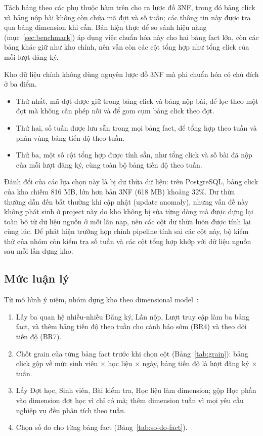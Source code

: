 Tách bảng theo các phụ thuộc hàm trên cho ra lược đồ 3NF, trong đó bảng click và bảng nộp bài không còn chứa mã đợt và số tuần; các thông tin này được tra qua bảng dimension khi cần. Bản hiện thực để so sánh hiệu năng (mục~\ref{sec:benchmark}) áp dụng việc chuẩn hóa này cho hai bảng fact lớn, còn các bảng khác giữ như kho chính, nên vẫn còn các cột tổng hợp như tổng click của mỗi lượt đăng ký.

Kho dữ liệu chính không dùng nguyên lược đồ 3NF mà phi chuẩn hóa có chủ đích ở ba điểm.
\begin{itemize}
    \item Thứ nhất, mã đợt được giữ trong bảng click và bảng nộp bài, để lọc theo một đợt mà không cần phép nối và để gom cụm bảng click theo đợt.
    \item Thứ hai, số tuần được lưu sẵn trong mọi bảng fact, để tổng hợp theo tuần và phân vùng bảng tiến độ theo tuần.
    \item Thứ ba, một số cột tổng hợp được tính sẵn, như tổng click và số bài đã nộp của mỗi lượt đăng ký, cùng toàn bộ bảng tiến độ theo tuần.
\end{itemize}

Đánh đổi của các lựa chọn này là bị dư thừa dữ liệu: trên PostgreSQL, bảng click của kho chiếm 816 MB, lớn hơn bản 3NF (618 MB) khoảng 32\%. Dư thừa thường dẫn đến bất thường khi cập nhật (update anomaly), nhưng vấn đề này không phát sinh ở project này do kho không bị sửa từng dòng mà được dựng lại toàn bộ từ dữ liệu nguồn ở mỗi lần nạp, nên các cột dư thừa luôn được tính lại cùng lúc. Để phát hiện trường hợp chính pipeline tính sai các cột này, bộ kiểm thử của nhóm còn kiểm tra số tuần và các cột tổng hợp khớp với dữ liệu nguồn sau mỗi lần dựng kho.

\subsection{Mức luận lý}
\label{sec:luan-ly}

Từ mô hình ý niệm, nhóm dựng kho theo dimensional model~\cite{kimball2013}:
\begin{enumerate}
  \item Lấy ba quan hệ nhiều-nhiều Đăng ký, Lần nộp, Lượt truy cập làm ba bảng fact, và thêm bảng tiến độ theo tuần cho cảnh báo sớm (BR4) và theo dõi tiến độ (BR7).
  \item Chốt grain của từng bảng fact trước khi chọn cột (Bảng~\ref{tab:grain}): bảng click gộp về mức sinh viên $\times$ học liệu $\times$ ngày, bảng tiến độ là lượt đăng ký $\times$ tuần.
  \item Lấy Đợt học, Sinh viên, Bài kiểm tra, Học liệu làm dimension; gộp Học phần vào dimension đợt học vì chỉ có mã; thêm dimension tuần vì mọi yêu cầu nghiệp vụ đều phân tích theo tuần.
  \item Chọn số đo cho từng bảng fact (Bảng~\ref{tab:so-do-fact}).
\end{enumerate}

